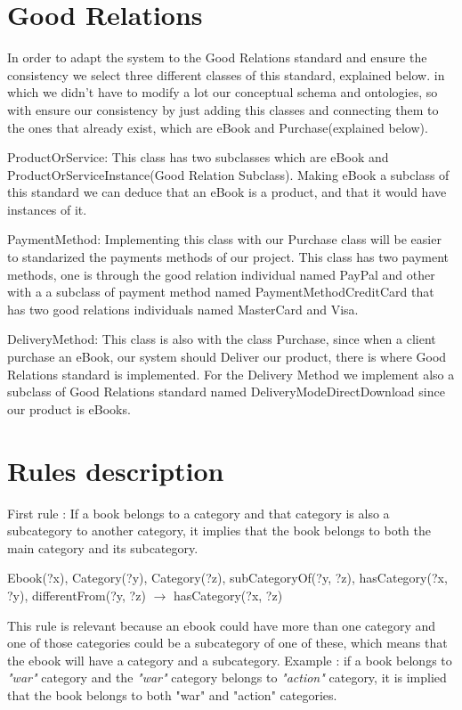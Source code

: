 \documentclass[a4paper,12pt]{article}
\begin{document}
\section{Good Relations}
In order to adapt the system to the Good Relations standard and ensure the consistency we select three different classes of this standard, explained below. in which we didn’t have to modify a lot our conceptual schema and ontologies, so with ensure our consistency by just adding this classes and connecting them to the ones that already exist, which are eBook and Purchase(explained below).

ProductOrService: This class has two subclasses which are eBook and
ProductOrServiceInstance(Good Relation Subclass). Making eBook a subclass of this standard
we can deduce that an eBook is a product, and that it would have instances of it.

PaymentMethod: Implementing this class with our Purchase class will be easier to standarized
the payments methods of our project. This class has two payment methods, one is through the
good relation individual named PayPal and other with a a subclass of payment method named
PaymentMethodCreditCard that has two good relations individuals named MasterCard and Visa.

DeliveryMethod: This class is also with the class Purchase, since when a client purchase an
eBook, our system should Deliver our product, there is where Good Relations standard is
implemented. For the Delivery Method we implement also a subclass of Good Relations standard
named DeliveryModeDirectDownload since our product is eBooks.
\section{Rules description}
First rule : If a book belongs to a category and that category is also a subcategory to another
category, it implies that the book belongs to both the main category and its subcategory.

Ebook(?x), Category(?y), Category(?z), subCategoryOf(?y, ?z), hasCategory(?x, ?y), differentFrom(?y, ?z) $\rightarrow$ hasCategory(?x, ?z)

This rule is relevant because an ebook could have more than one category and one of those categories could
be a subcategory of one of these, which means that the ebook will have a category and a subcategory.
Example : if a book belongs to \textit{"war"} category and the \textit{"war"} category belongs to \textit{"action"} category,
it is implied that the book belongs to both "war" and "action" categories.\\
\end{document}
